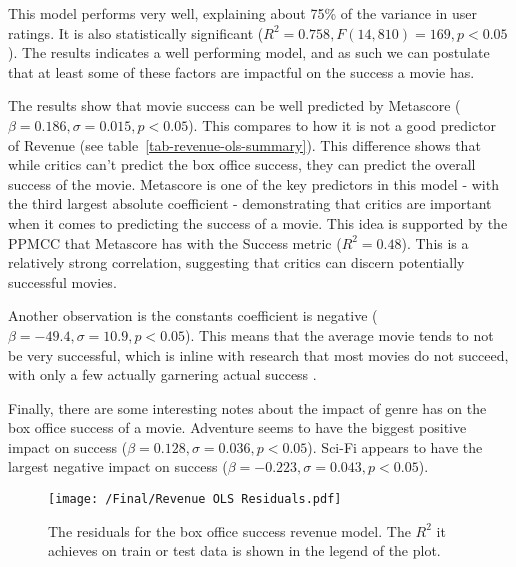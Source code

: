         \begin{multicols}{2}
            This model performs very well, explaining about 75\% of the variance in user
                ratings.
            It is also statistically significant ($R^2=0.758, F(14,810)=169, p<0.05$).
            The results indicates a well performing model, and as such we can postulate
                that at least some of these factors are impactful on the success a movie has.

            The results show that movie success can be well predicted by Metascore
                ($\beta=0.186, \sigma=0.015, p<0.05$).
            This compares to how it is not a good predictor of Revenue (see
                table~\ref{tab-revenue-ols-summary}).
            This difference shows that while critics can't predict the box office success,
                they can predict the overall success of the movie.
            Metascore is one of the key predictors in this model - with the third largest
                absolute coefficient - demonstrating that critics are important when it comes
                to predicting the success of a movie.
            This idea is supported by the PPMCC that Metascore has with the Success metric
                ($R^2=0.48$).
            This is a relatively strong correlation, suggesting that critics can discern
                potentially successful movies.

            Another observation is the constants coefficient is negative
                ($\beta=-49.4,\sigma=10.9,p<0.05$).
            This means that the average movie tends to not be very successful, which is
                inline with research that most movies do not succeed, with only a few actually
                garnering actual success \cite{walls2005modelling}.

            Finally, there are some interesting notes about the impact of genre has on the
                box office success of a movie.
            Adventure seems to have the biggest positive impact on success
                ($\beta=0.128,\sigma=0.036,p<0.05$).
            Sci-Fi appears to have the largest negative impact on success
                ($\beta=-0.223,\sigma=0.043,p<0.05$).

            \begin{figure}[H]
                \texttt{[image: /Final/Revenue OLS Residuals.pdf]}
                \caption[short]{The residuals for the box office success revenue model. 
                                The $R^2$ it achieves on train or test data is shown in
                                the legend of the plot.}\label{fig-revenue-ols-residuals}
            \end{figure}


\end{multicols}
